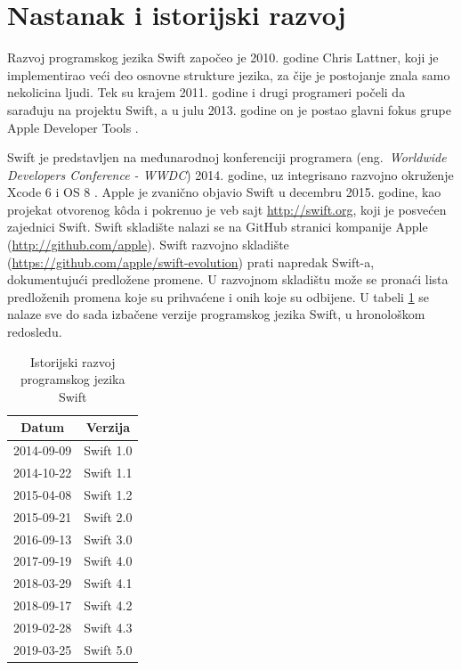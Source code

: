 \documentclass[a4paper]{article}
\begin{document}
\section{Nastanak i istorijski razvoj}
\label{sec:drugiDeo}
Razvoj programskog jezika Swift započeo je 2010. godine Chris Lattner, koji je implementirao veći deo osnovne strukture jezika, za čije je postojanje znala samo nekolicina ljudi. Tek su krajem 2011. godine i drugi programeri počeli da sarađuju na projektu Swift, a u julu 2013. godine on je postao glavni fokus grupe Apple Developer Tools \cite{mastering_swift3}. 

Swift je predstavljen na međunarodnoj konferenciji programera (eng.~{\em Worldwide Developers Conference - WWDC}) 2014. godine, uz integrisano razvojno okruženje Xcode 6 i OS 8 \cite{thenextweb_sajt}. Apple je zvanično objavio Swift u decembru 2015. godine, kao projekat otvorenog k\^{o}da i pokrenuo je veb sajt \url{http://swift.org}, koji je posvećen zajednici Swift. Swift skladište nalazi se na GitHub stranici kompanije Apple (\url{http://github.com/apple}). Swift razvojno skladište (\url{https://github.com/apple/swift-evolution}) prati napredak Swift-a, dokumentujući predložene promene. U razvojnom skladištu može se pronaći lista predloženih promena koje su prihvaćene i onih koje su odbijene. U tabeli \ref{tab:razvoj} se nalaze sve do sada izbačene verzije programskog jezika Swift, u hronološkom redosledu.

\begin{table}[h!]
\begin{center}
\caption{Istorijski razvoj programskog jezika Swift}
\begin{tabular}{|c|c|} \hline
\label{tab:razvoj}
\textbf{Datum} & \textbf{Verzija} \\ \hline
2014-09-09 & Swift 1.0 \\ \hline
2014-10-22 & Swift 1.1 \\ \hline
2015-04-08 & Swift 1.2 \\ \hline
2015-09-21 & Swift 2.0 \\ \hline
2016-09-13 & Swift 3.0 \\ \hline
2017-09-19 & Swift 4.0 \\ \hline
2018-03-29 & Swift 4.1 \\ \hline
2018-09-17 & Swift 4.2 \\ \hline
2019-02-28 & Swift 4.3 \\ \hline
2019-03-25 & Swift 5.0 \\ \hline
\end{tabular}
\end{center}
\end{table}
\end{document}
